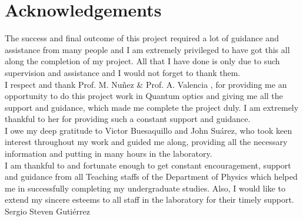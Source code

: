 \chapter*{Acknowledgements}


The success and final outcome of this project required a lot of guidance and assistance from many people and I am extremely privileged to have got this all along the completion of my project. All that I have done is only due to such supervision and assistance and I would not forget to thank them.~\\

I respect and thank Prof. M. Nuñez \& Prof. A. Valencia , for providing me an opportunity to do this project work in Quantum optics and giving me all the  support and guidance, which made me complete the project duly. I am extremely thankful to her for providing such a constant support and guidance.~\\

I owe my deep gratitude to Victor Buesaquillo and John Suárez, who took keen interest throughout my work and guided me along, providing all the necessary information and putting in  many hours in the laboratory.~\\

 
I am thankful to and fortunate enough to get constant encouragement, support and guidance from all Teaching staffs of  the Department of Physics which helped me in successfully completing my undergraduate studies. Also, I would like to extend my sincere esteems to all staff in the laboratory for their timely support.~\\

 
Sergio Steven Gutiérrez





\tableofcontents
\listoffigures
\lstlistoflistings
\clearpage











